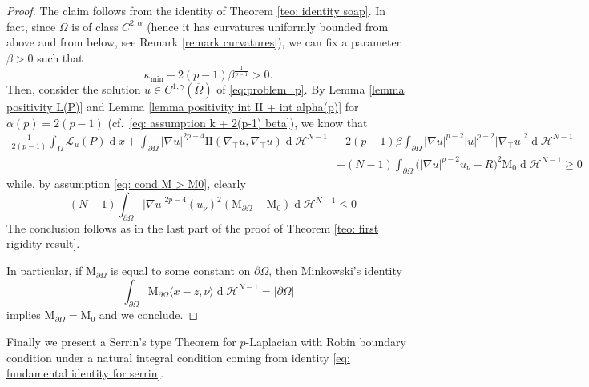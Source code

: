 \documentclass[10pt,a4paper, reqno]{amsart}
\numberwithin{equation}{section}
\renewcommand{\d}[1]{\ensuremath{\operatorname{d}\!{#1}}}
\begin{document}
    \begin{proof}
    The claim follows from the identity of Theorem \ref{teo: identity soap}. In fact, since $\Omega$ is of class $C^{2,\alpha}$ (hence it has curvatures uniformly bounded from above and from below, see Remark \ref{remark curvatures}), we can fix a parameter $\beta > 0$ such that
    \begin{equation}\label{eq: assumption k + 2(p-1) beta}
    \kappa_{\min} + 2(p-1)\beta^{\frac{1}{p-1}} > 0.
    \end{equation}
    Then, consider the solution $u \in C^{1,\gamma}(\overline{\Omega}) $ of \eqref{eq:problem_p}. By Lemma \ref{lemma positivity L(P)} and Lemma \ref{lemma positivity int II + int alpha(p)} for $\alpha(p)=2(p-1)$ (cf.\, \eqref{eq: assumption k + 2(p-1) beta}), we know that
    \begin{equation*}
    \begin{aligned}
    \frac{1}{2(p-1)}\int_\Omega \mathcal{L}_u(P) \d{x} 
    +\int_{\partial\Omega} |\nabla u|^{2p-4} \mathrm{I\!I}(\nabla_\top u,\nabla_\top u) \d{}\mathcal{H}^{N-1}
    &+ 2(p-1)\beta \int_{\partial\Omega} |\nabla u|^{p-2}|u|^{p-2}|\nabla_\top u|^2 \d{}\mathcal{H}^{N-1} 
    \\
    &+ (N-1) \int_{\partial\Omega} \Big(|\nabla u|^{p-2} u_\nu - R \Big)^2  \mathrm{M}_{0} \d{}\mathcal{H}^{N-1} 
    \geq 0
    \end{aligned}
    \end{equation*}
    while, by assumption \eqref{eq: cond M > M0}, clearly
    \begin{equation*}
        - (N-1) \int_{\partial\Omega} |\nabla u|^{2p-4} (u_\nu)^2 (\mathrm{M}_{\partial\Omega} - \mathrm{M}_{0} ) \d{}\mathcal{H}^{N-1}  \leq 0
    \end{equation*}
    The conclusion follows as in the last part of the proof of Theorem \ref{teo: first rigidity result}. 

    In particular, if $\mathrm{M}_{\partial\Omega}$ is equal to some constant on $\partial\Omega$, then Minkowski's identity 
    \begin{equation*}
        \int_{\partial\Omega} \mathrm{M}_{\partial\Omega} \langle x-z, \nu \rangle \d{}\mathcal{H}^{N-1} = |\partial\Omega| 
    \end{equation*}
    implies $\mathrm{M}_{\partial\Omega} = \mathrm{M}_{0}$ and we conclude.
\end{proof}

Finally we present a Serrin's type Theorem for $p$-Laplacian with Robin boundary condition under a natural integral condition coming from identity \eqref{eq: fundamental identity for serrin}.
\end{document}
